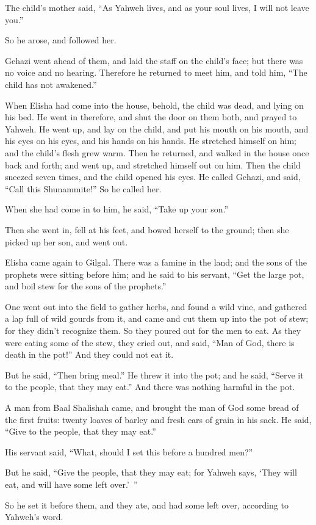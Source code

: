 {\par }{\PP {}The child’s mother said, “As Yahweh lives, and as your soul lives, I will not leave you.”
\par }{\PP So he arose, and followed her.
\par }{\PP {}Gehazi went ahead of them, and laid the staff on the child’s face; but there was no voice and no hearing. Therefore he returned to meet him, and told him, “The child has not awakened.”
\par }{\PP {}When Elisha had come into the house, behold, the child was dead, and lying on his bed.
He went in therefore, and shut the door on them both, and prayed to Yahweh.
He went up, and lay on the child, and put his mouth on his mouth, and his eyes on his eyes, and his hands on his hands. He stretched himself on him; and the child’s flesh grew warm.
Then he returned, and walked in the house once back and forth; and went up, and stretched himself out on him. Then the child sneezed seven times, and the child opened his eyes.
He called Gehazi, and said, “Call this Shunammite!” So he called her.
\par }{\PP When she had come in to him, he said, “Take up your son.”
\par }{\PP {}Then she went in, fell at his feet, and bowed herself to the ground; then she picked up her son, and went out.
\par }{\PP {}Elisha came again to Gilgal. There was a famine in the land; and the sons of the prophets were sitting before him; and he said to his servant, “Get the large pot, and boil stew for the sons of the prophets.”
\par }{\PP {}One went out into the field to gather herbs, and found a wild vine, and gathered a lap full of wild gourds from it, and came and cut them up into the pot of stew; for they didn’t recognize them.
So they poured out for the men to eat. As they were eating some of the stew, they cried out, and said, “Man of God, there is death in the pot!” And they could not eat it.
\par }{\PP {}But he said, “Then bring meal.” He threw it into the pot; and he said, “Serve it to the people, that they may eat.” And there was nothing harmful in the pot.
\par }{\PP {}A man from Baal Shalishah came, and brought the man of God some bread of the first fruits: twenty loaves of barley and fresh ears of grain in his sack. He said, “Give to the people, that they may eat.”
\par }{\PP {}His servant said, “What, should I set this before a hundred men?”
\par }{\PP But he said, “Give the people, that they may eat; for Yahweh says, ‘They will eat, and will have some left over.’ ”
\par }{\PP {}So he set it before them, and they ate, and had some left over, according to Yahweh’s word.

}
